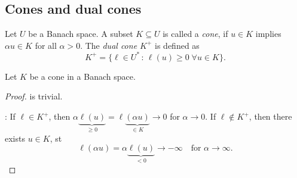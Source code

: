 \documentclass[../skript.tex]{subfiles}
\begin{document}
\subsection{Cones and dual cones}
\begin{definition} %
\label{def:c1e35}
Let $U$ be a Banach space. A subset $K \subseteq U$ is called a \emph{cone}, if $u \in K$ implies $\alpha u \in K$ for all $\alpha > 0$. The \emph{dual cone $K^+$} is defined as
\[
	K^+ = \{ \ell \in U^* \, : \, \ell(u) \geq 0 \; \forall u \in K \}.
\]
\end{definition}
\begin{proposition} %
\label{prop:c1e36}
Let $K$ be a cone in a Banach space.
\end{proposition}
\begin{proof}
 is trivial.

: If $\ell \in K^+$, then $\alpha \underbrace{ \ell(u) }_{\geq 0} = \ell\underbrace{(\alpha u)}_{\in K} \to 0$ for $\alpha \to 0$. If $\ell \notin K^+$, then there exists $u \in K$, \ac{st}
\[
	\ell(\alpha u) = \alpha \underbrace{\ell(u)}_{< 0} \to -\infty \quad \text{for } \alpha \to \infty.
\]
\end{proof}
\end{document}
